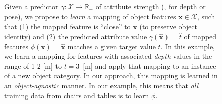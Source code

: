 \documentclass[10pt,twocolumn,letterpaper]{article}
\newcommand{\mn}[1]{{\color{magenta}{#1}}}
\begin{document}
\begin{figure}[t!]
\caption{\label{fig:intro} Given a predictor $\gamma: \mathcal{X} \to \mathbb{R}_+$ of attribute
strength (\eg, for depth or pose), we propose to \emph{learn} a mapping 
of object features $\mathbf{x} \in \mathcal{X}$, such that
(1) the mapped feature is ``close'' to $\mathbf{x}$ (to preserve object identity) and (2) the predicted 
attribute value $\gamma(\hat{\mathbf{x}}) = \hat{t}$ of mapped features 
$\phi(\mathbf{x}) = \hat{\mathbf{x}}$
matches a given target value $t$. In this example,
we learn a mapping for features with associated \emph{depth} values in the
range of 1-2 [m] to $t=3$~[m] and apply that mapping to an instance of a new 
object category. In our approach, this mapping is learned in 
an \emph{object-agnostic} manner. In our example, this means that
\emph{all} training data from chairs and tables is \mn{used} to learn $\phi$.}
\end{figure}
\end{document}
